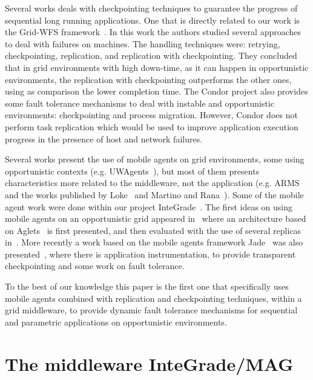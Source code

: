 \documentclass[times, 09pt, twocolumn]{article}
\begin{document}
Several works deals with checkpointing techniques to guarantee the progress of
sequential long running applications. One that is directly related to our
work is the Grid-WFS framework~\cite{hwang03}. In this work the authors studied several approaches to
deal with failures on machines. The handling techniques were: retrying, checkpointing,
replication, and replication with checkpointing. They concluded that in grid
environments with high down-time, as it can happen in opportunistic environments,
the replication with checkpointing outperforms the other ones, using as comparison
the lower completion time. The Condor project also provides some fault tolerance mechanisms
to deal with instable and opportunistic environments: checkpointing and process
migration. However, Condor does not perform task replication which would be
used to improve application execution progress in the presence of host and
network failures.

Several works present the use of mobile agents on grid environments, some using
opportunistic contexts (e.g. UWAgents~\cite{fukuda06}), but most of them
presents characteristics more related to the middleware, not the application
(e.g. ARMS~\cite{cao02} and the works published by Loke~\cite{loke03} and
Martino and Rana~\cite{martino04}). Some of the mobile agent work were done
within our project InteGrade~\cite{goldchleger04}. The first ideas on using
mobile agents on an opportunistic grid appeared in~\cite{barbosa04} where an
architecture based on Aglets~\cite{aglets} is first presented, and then
evaluated with the use of several replicas in~\cite{barbosa05}. More recently a
work based on the mobile agents framework Jade~\cite{jade} was also
presented~\cite{lopes05,lopes06_2}, where there is application instrumentation,
to provide transparent checkpointing and some work on fault tolerance.

To the best of our knowledge this paper is the first one that specifically uses
mobile agents combined with replication and checkpointing techniques, within a
grid middleware, to provide dynamic fault tolerance mechanisms for sequential
and parametric applications on opportunistic environments.


\section{The middleware InteGrade/MAG}\label{sec:arch}
\end{document}
